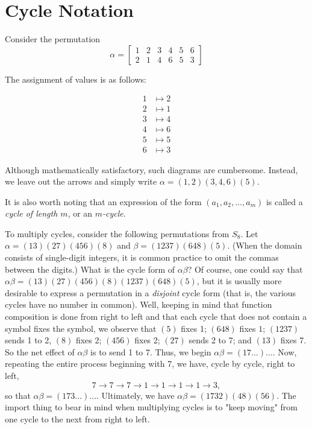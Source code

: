 \section{Cycle Notation}
\begin{definition}
	Consider the permutation
	\[ \alpha = \begin{bmatrix}
			1 & 2 & 3 & 4 & 5 & 6 \\
			2 & 1 & 4 & 6 & 5 & 3
		\end{bmatrix}\]

	The assignment of values is as follows:

	\begin{align*}
		1 & \mapsto 2 \\
		2 & \mapsto 1 \\
		3 & \mapsto 4 \\
		4 & \mapsto 6 \\
		5 & \mapsto 5 \\
		6 & \mapsto 3
	\end{align*}

	Although mathematically satisfactory, such diagrams are cumbersome. Instead, we leave out the arrows and simply write $\alpha = (1,2)(3,4,6)(5)$.

	It is also worth noting that an expression of the form $(a_1, a_2, \dots, a_m)$ is called a \textit{cycle of length $m$}, or an \textit{$m$-cycle}.
\end{definition}
\begin{example}
	To multiply cycles, consider the following permutations from $S_8$. Let $\alpha = (13)(27)(456)(8)$ and $\beta = (1237)(648)(5)$. (When the domain consists of single-digit integers, it is common practice to omit the commas between the digits.) What is the cycle form of $\alpha\beta$? Of course, one could say that $\alpha\beta = (13)(27)(456)(8)(1237)(648)(5)$, but it is usually more desirable to express a permutation in a \textit{disjoint} cycle form (that is, the various cycles have no number in common). Well, keeping in mind that function composition is done from right to left and that each cycle that does not contain a symbol fixes the symbol, we observe that $(5)$ fixes 1; $(648)$ fixes $1$; $(1237)$ sends 1 to 2, $(8)$ fixes 2; $(456)$ fixes 2; $(27)$ sends 2 to 7; and $(13)$ fixes 7. So the net effect of $\alpha\beta$ is to send 1 to 7. Thus, we begin $\alpha\beta=(17\dots)\dots$. Now, repeating the entire process beginning with 7, we have, cycle by cycle, right to left,
	\[ 7 \to 7 \to 7 \to 1 \to 1 \to 1 \to 1 \to 3, \]
	so that $\alpha\beta = (173\dots)\dots$. Ultimately, we have $\alpha\beta = (1732)(48)(56)$. The import thing to bear in mind when multiplying cycles is to "keep moving" from one cycle to the next from right to left.
\end{example}
